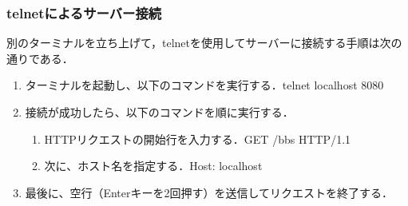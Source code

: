\documentclass[uplatex,dvipdfmx]{jsarticle}
\begin{document}
\subsubsection{telnetによるサーバー接続}
別のターミナルを立ち上げて，telnetを使用してサーバーに接続する手順は次の通りである．
\begin{enumerate} 
    \item ターミナルを起動し、以下のコマンドを実行する．telnet localhost 8080
    \item 接続が成功したら、以下のコマンドを順に実行する．
    \begin{enumerate} 
        \item HTTPリクエストの開始行を入力する．GET /bbs HTTP/1.1
        \item 次に、ホスト名を指定する．Host: localhost
    \end{enumerate} 
    \item 最後に、空行（Enterキーを2回押す）を送信してリクエストを終了する． 
\end{enumerate}
\end{document}
